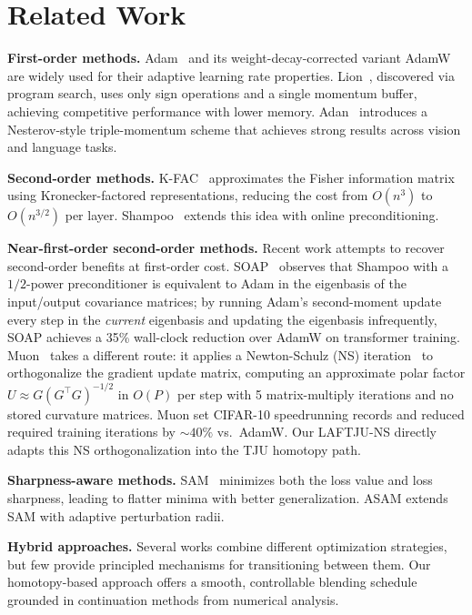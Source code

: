 \documentclass[10pt,twocolumn]{article}
\newcommand{\method}{LAFTJU}
\begin{document}
\section{Related Work}

\textbf{First-order methods.} Adam~\cite{adam} and its weight-decay-corrected variant AdamW~\cite{adamw} are widely used for their adaptive learning rate properties. Lion~\cite{lion}, discovered via program search, uses only sign operations and a single momentum buffer, achieving competitive performance with lower memory. Adan~\cite{adan} introduces a Nesterov-style triple-momentum scheme that achieves strong results across vision and language tasks.

\textbf{Second-order methods.} K-FAC~\cite{kfac} approximates the Fisher information matrix using Kronecker-factored representations, reducing the cost from $O(n^3)$ to $O(n^{3/2})$ per layer. Shampoo~\cite{shampoo} extends this idea with online preconditioning.

\textbf{Near-first-order second-order methods.} Recent work attempts to recover second-order benefits at first-order cost. SOAP~\cite{soap} observes that Shampoo with a $1/2$-power preconditioner is equivalent to Adam in the eigenbasis of the input/output covariance matrices; by running Adam's second-moment update every step in the \emph{current} eigenbasis and updating the eigenbasis infrequently, SOAP achieves a 35\% wall-clock reduction over AdamW on transformer training. Muon~\cite{muon} takes a different route: it applies a Newton-Schulz (NS) iteration~\cite{kosson} to orthogonalize the gradient update matrix, computing an approximate polar factor $U \approx G(G^\top G)^{-1/2}$ in $O(P)$ per step with 5 matrix-multiply iterations and no stored curvature matrices. Muon set CIFAR-10 speedrunning records and reduced required training iterations by $\sim\!40\%$ vs.\ AdamW. Our \method{}-NS directly adapts this NS orthogonalization into the TJU homotopy path.

\textbf{Sharpness-aware methods.} SAM~\cite{sam} minimizes both the loss value and loss sharpness, leading to flatter minima with better generalization. ASAM extends SAM with adaptive perturbation radii.

\textbf{Hybrid approaches.} Several works combine different optimization strategies, but few provide principled mechanisms for transitioning between them. Our homotopy-based approach offers a smooth, controllable blending schedule grounded in continuation methods from numerical analysis.
\end{document}

